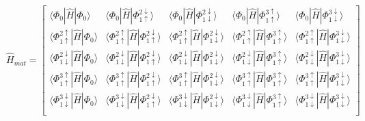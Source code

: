 \documentclass{article}
\begin{document}
\begin{equation}
\hat H_{mat} = 
\begin{bmatrix}
\langle \Phi_0 | \hat H | \Phi_0 \rangle & 
\langle \Phi_{0} | \hat H | \Phi_{1\uparrow}^{2\downarrow} \rangle &
\langle \Phi_0 | \hat H | \Phi_{1\downarrow}^{2\downarrow} \rangle & 
\langle \Phi_0 | \hat H | \Phi_{1\uparrow}^{3\uparrow} \rangle &
\langle \Phi_0 | \hat H | \Phi_{1\downarrow}^{3\downarrow} \rangle \\

\langle \Phi_{1\uparrow}^{2\uparrow} | \hat H | \Phi_0 \rangle & 
\langle \Phi_{1\uparrow}^{2\uparrow} | \hat H | \Phi_{1\uparrow}^{2\downarrow} \rangle &
\langle \Phi_{1\uparrow}^{2\uparrow} | \hat H | \Phi_{1\downarrow}^{2\downarrow} \rangle & 
\langle \Phi_{1\uparrow}^{2\uparrow} | \hat H | \Phi_{1\uparrow}^{3\uparrow} \rangle &
\langle \Phi_{1\uparrow}^{2\uparrow} | \hat H | \Phi_{1\downarrow}^{3\downarrow} \rangle \\

\langle \Phi_{1\downarrow}^{2\downarrow} | \hat H | \Phi_0 \rangle & 
\langle \Phi_{1\downarrow}^{2\downarrow} | \hat H | \Phi_{1\uparrow}^{2\downarrow} \rangle &
\langle \Phi_{1\downarrow}^{2\downarrow} | \hat H | \Phi_{1\downarrow}^{2\downarrow} \rangle & 
\langle \Phi_{1\downarrow}^{2\downarrow} | \hat H | \Phi_{1\uparrow}^{3\uparrow} \rangle &
\langle \Phi_{1\downarrow}^{2\downarrow} | \hat H | \Phi_{1\downarrow}^{3\downarrow} \rangle \\

\langle \Phi_{1\uparrow}^{3\uparrow} | \hat H | \Phi_0 \rangle & 
\langle \Phi_{1\uparrow}^{3\uparrow} | \hat H | \Phi_{1\uparrow}^{2\downarrow} \rangle &
\langle \Phi_{1\uparrow}^{3\uparrow} | \hat H | \Phi_{1\downarrow}^{2\downarrow} \rangle & 
\langle \Phi_{1\uparrow}^{3\uparrow} | \hat H | \Phi_{1\uparrow}^{3\uparrow} \rangle &
\langle \Phi_{1\uparrow}^{3\uparrow} | \hat H | \Phi_{1\downarrow}^{3\downarrow} \rangle \\

\langle \Phi_{1\downarrow}^{3\downarrow} | \hat H | \Phi_0 \rangle & 
\langle \Phi_{1\downarrow}^{3\downarrow} | \hat H | \Phi_{1\uparrow}^{2\downarrow} \rangle &
\langle \Phi_{1\downarrow}^{3\downarrow} | \hat H | \Phi_{1\downarrow}^{2\downarrow} \rangle & 
\langle \Phi_{1\downarrow}^{3\downarrow} | \hat H | \Phi_{1\uparrow}^{3\uparrow} \rangle &
\langle \Phi_{1\downarrow}^{3\downarrow} | \hat H | \Phi_{1\downarrow}^{3\downarrow} \rangle \\
\end{bmatrix}
\end{equation}
\end{document}
